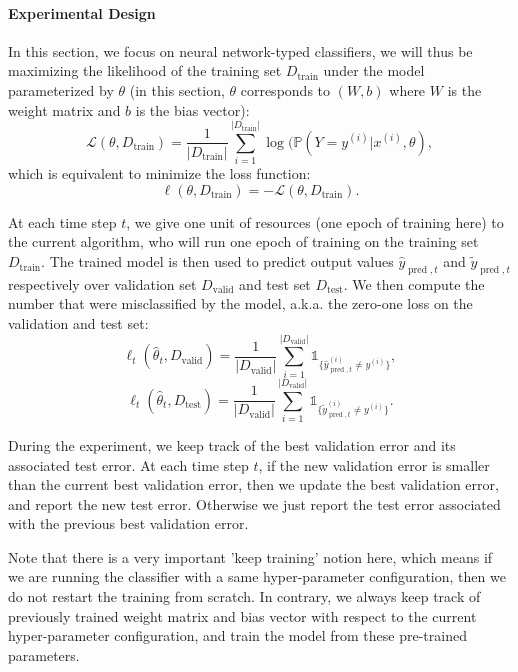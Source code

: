 \documentclass[runningheads,a4paper]{llncs}
\begin{document}
\paragraph{\textbf{Experimental Design}} In this section, we focus on neural network-typed classifiers, we will thus be maximizing the likelihood of the training set $D_{\operatorname{train}}$ under the model parameterized by $\theta$ (in this section, $\theta$ corresponds to $(W, b)$ where $W$ is the weight matrix and $b$ is the bias vector):
\[
\mathcal{L}(\theta, D_{\operatorname{train}}) = \frac{1}{|D_{\operatorname{train}}|} \sum_{i=1}^{|D_{\operatorname{train}}|} \log (\mathbb{P}(Y=y^{(i)}|x^{(i)},\theta),
\]
which is equivalent to minimize the loss function:
\[
\ell(\theta, D_{\operatorname{train}}) = -\mathcal{L}(\theta, D_{\operatorname{train}}).
\]

At each time step $t$, we give one unit of resources (one epoch of training here) to the current algorithm, who will run one epoch of training on the training set $D_{\operatorname{train}}$. The trained model is then used to predict output values $\hat{y}_{\operatorname{pred},t}$ and $\tilde{y}_{\operatorname{pred},t}$ respectively over validation set $D_{\operatorname{valid}}$ and test set $D_{\operatorname{test}}$. We then compute the number that were misclassified by the model, a.k.a. the zero-one loss on the validation and test set:
\[
\ell_t(\hat{\theta}_t, D_{\operatorname{valid}}) = \frac{1}{|D_{\operatorname{valid}}|} \sum_{i=1}^{|D_{\operatorname{valid}}|} \mathbb{1}_{\{\hat{y}_{\operatorname{pred},t}^{(i)} \neq y^{(i)}\}},
\]
\[
\ell_t(\hat{\theta}_t, D_{\operatorname{test}}) = \frac{1}{|D_{\operatorname{valid}}|} \sum_{i=1}^{|D_{\operatorname{valid}}|} \mathbb{1}_{\{\tilde{y}_{\operatorname{pred},t}^{(i)} \neq y^{(i)}\}}.
\]

During the experiment, we keep track of the best validation error and its associated test error. At each time step $t$, if the new validation error is smaller than the current best validation error, then we update the best validation error, and report the new test error. Otherwise we just report the test error associated with the previous best validation error.

Note that there is a very important 'keep training' notion here, which means if we are running the classifier with a same hyper-parameter configuration, then we do not restart the training from scratch. In contrary, we always keep track of previously trained weight matrix and bias vector with respect to the current hyper-parameter configuration, and train the model from these pre-trained parameters. 
\end{document}
